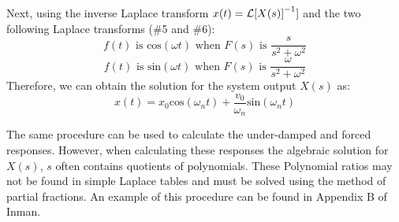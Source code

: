 \documentclass[12pt,letter]{article}
\begin{document}
			Next, using the inverse Laplace transform $x(t) = \mathcal{L}{\left[X(s)\right]}^{-1}]$ and the two following Laplace transforms (\#5 and \#6):
			\begin{equation}
			f(t) \text{ is cos}(\omega t) \text{ when }  F(s) \text{ is } \frac{s}{s^2+\omega^2} 
			\end{equation}
			\begin{equation}
			f(t) \text{ is sin}(\omega t)  \text{ when }  F(s) \text{ is } \frac{\omega}{s^2+\omega^2} 
			\end{equation}
			Therefore, we can obtain the solution for the system output $X(s)$ as:
			\begin{equation}
			x(t) = x_0 \text{cos}(\omega_n t) + \frac{v_0}{\omega_n}\text{sin}(\omega_n t)
			\end{equation}
			
			The same procedure can be used to calculate the under-damped and forced responses. However, when calculating these responses the algebraic solution for $X(s)$, $s$ often contains quotients of polynomials. These Polynomial ratios may not be found in simple Laplace tables and must be solved using the method of partial fractions. An example of this procedure can be found in Appendix B of Inman. 
\end{document}
